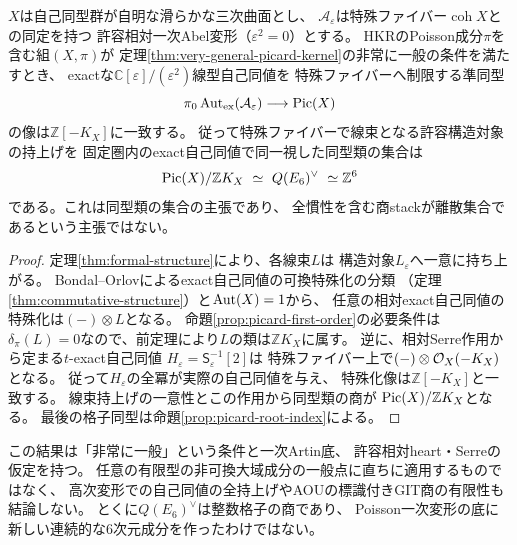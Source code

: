 \begin{corollary}[非常に一般の非可換fiberでの構造対象の同型類]\label{cor:first-order-pointings}
$X$は自己同型群が自明な滑らかな三次曲面とし、
$\mathcal A_\varepsilon$は特殊ファイバー$\operatorname{coh}X$との同定を持つ
許容相対一次Abel変形（$\varepsilon^2=0$）とする。
HKRのPoisson成分$\pi$を含む組$(X,\pi)$が
定理\ref{thm:very-general-picard-kernel}の非常に一般の条件を満たすとき、
exactな$\mathbb C[\varepsilon]/(\varepsilon^2)$線型自己同値を
特殊ファイバーへ制限する準同型
\[
 \pi_0\operatorname{Aut}_{\rm ex}(\mathcal A_\varepsilon)
       \longrightarrow\operatorname{Pic}(X)
\]
の像は$\mathbb Z[-K_X]$に一致する。
従って特殊ファイバーで線束となる許容構造対象の持上げを
固定圏内のexact自己同値で同一視した同型類の集合は
\begin{equation}\label{eq:very-general-pointings}
 \operatorname{Pic}(X)/\mathbb ZK_X
 \ \simeq\ Q(E_6)^\vee
 \ \simeq\mathbb Z^6
\end{equation}
である。これは同型類の集合の主張であり、
全慣性を含む商stackが離散集合であるという主張ではない。
\end{corollary}
\begin{proof}
定理\ref{thm:formal-structure}により、各線束$L$は
構造対象$L_\varepsilon$へ一意に持ち上がる。
Bondal--Orlovによるexact自己同値の可換特殊化の分類
（定理\ref{thm:commutative-structure}）と$\operatorname{Aut}(X)=1$から、
任意の相対exact自己同値の特殊化は$(-)\otimes L$となる。
命題\ref{prop:picard-first-order}の必要条件は
$\delta_\pi(L)=0$なので、前定理により$L$の類は$\mathbb ZK_X$に属す。
逆に、相対Serre作用から定まる$t$-exact自己同値
$H_\varepsilon=\mathsf S_\varepsilon^{-1}[2]$は
特殊ファイバー上で$(-)\otimes\mathcal O_X(-K_X)$となる。
従って$H_\varepsilon$の全冪が実際の自己同値を与え、
特殊化像は$\mathbb Z[-K_X]$と一致する。
線束持上げの一意性とこの作用から同型類の商が
$\operatorname{Pic}(X)/\mathbb ZK_X$となる。
最後の格子同型は命題\ref{prop:picard-root-index}による。
\end{proof}

\begin{remark}
この結果は「非常に一般」という条件と一次Artin底、
許容相対heart・Serreの仮定を持つ。
任意の有限型の非可換大域成分の一般点に直ちに適用するものではなく、
高次変形での自己同値の全持上げやAOUの標識付きGIT商の有限性も結論しない。
とくに$Q(E_6)^\vee$は整数格子の商であり、
Poisson一次変形の底に新しい連続的な6次元成分を作ったわけではない。
\end{remark}

